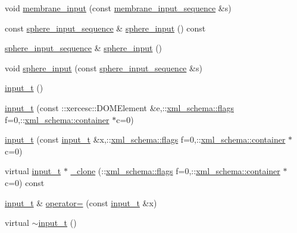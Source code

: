 \begin{DoxyCompactItemize}
\item 
void \hyperlink{classinput__t_a790aa48e13cbc7b014a70109a5942903}{membrane\+\_\+input} (const \hyperlink{classinput__t_a455e36bc8b009abdbd13c6d167864cfe}{membrane\+\_\+input\+\_\+sequence} \&s)
\item 
const \hyperlink{classinput__t_aa968afe5c55f7cc3031e6196adddcae5}{sphere\+\_\+input\+\_\+sequence} \& \hyperlink{classinput__t_abb6b015f0faa92bff850d921d4aad2b7}{sphere\+\_\+input} () const 
\item 
\hyperlink{classinput__t_aa968afe5c55f7cc3031e6196adddcae5}{sphere\+\_\+input\+\_\+sequence} \& \hyperlink{classinput__t_a3173f5cec229bff952ac6d965135d0ca}{sphere\+\_\+input} ()
\item 
void \hyperlink{classinput__t_acf44523ff6b17315300e30fbebe9f6db}{sphere\+\_\+input} (const \hyperlink{classinput__t_aa968afe5c55f7cc3031e6196adddcae5}{sphere\+\_\+input\+\_\+sequence} \&s)
\item 
\hyperlink{classinput__t_acd30ace524c19489ac1076e29e29c4cf}{input\+\_\+t} ()
\item 
\hyperlink{classinput__t_ad5e6bb4ad3034e6072766d292a9b2f06}{input\+\_\+t} (const \+::xercesc\+::\+D\+O\+M\+Element \&e,\+::\hyperlink{namespacexml__schema_a0612287d030cb2732d31a45b258fdc87}{xml\+\_\+schema\+::flags} f=0,\+::\hyperlink{namespacexml__schema_ada9aa30dc722e93ee2ed7243085402a5}{xml\+\_\+schema\+::container} $\ast$c=0)
\item 
\hyperlink{classinput__t_aa61c09ee6e6c8849e08296ea0ce9cdf9}{input\+\_\+t} (const \hyperlink{classinput__t}{input\+\_\+t} \&x,\+::\hyperlink{namespacexml__schema_a0612287d030cb2732d31a45b258fdc87}{xml\+\_\+schema\+::flags} f=0,\+::\hyperlink{namespacexml__schema_ada9aa30dc722e93ee2ed7243085402a5}{xml\+\_\+schema\+::container} $\ast$c=0)
\item 
virtual \hyperlink{classinput__t}{input\+\_\+t} $\ast$ \hyperlink{classinput__t_a5113f4bf339b6e9f325fa1c0dc2a03de}{\+\_\+clone} (\+::\hyperlink{namespacexml__schema_a0612287d030cb2732d31a45b258fdc87}{xml\+\_\+schema\+::flags} f=0,\+::\hyperlink{namespacexml__schema_ada9aa30dc722e93ee2ed7243085402a5}{xml\+\_\+schema\+::container} $\ast$c=0) const 
\item 
\hyperlink{classinput__t}{input\+\_\+t} \& \hyperlink{classinput__t_ac0f3874f508379a49375e681699ffdc2}{operator=} (const \hyperlink{classinput__t}{input\+\_\+t} \&x)
\item 
virtual \hyperlink{classinput__t_adec69a9fb0ede4506dda7414275639c2}{$\sim$input\+\_\+t} ()
\end{DoxyCompactItemize}
